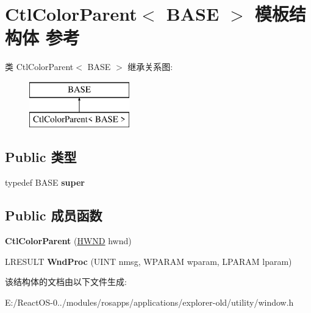 \hypertarget{struct_ctl_color_parent}{}\section{Ctl\+Color\+Parent$<$ B\+A\+SE $>$ 模板结构体 参考}
\label{struct_ctl_color_parent}
类 Ctl\+Color\+Parent$<$ B\+A\+SE $>$ 继承关系图\+:\begin{figure}[H]
\begin{center}
\leavevmode
\includegraphics[height=2.000000cm]{struct_ctl_color_parent}
\end{center}
\end{figure}
\subsection*{Public 类型}
\begin{DoxyCompactItemize}
\item 
\mbox{\label{struct_ctl_color_parent_a9f4a4cc96a7568c4eddf6995f6436ceb}} 
typedef B\+A\+SE {\bfseries super}
\end{DoxyCompactItemize}
\subsection*{Public 成员函数}
\begin{DoxyCompactItemize}
\item 
\mbox{\label{struct_ctl_color_parent_a9aa46d04e4dd06833fea2973e1244ac1}} 
{\bfseries Ctl\+Color\+Parent} (\hyperlink{interfacevoid}{H\+W\+ND} hwnd)
\item 
\mbox{\label{struct_ctl_color_parent_ac0792890eed5bc580118ea206e60477c}} 
L\+R\+E\+S\+U\+LT {\bfseries Wnd\+Proc} (U\+I\+NT nmsg, W\+P\+A\+R\+AM wparam, L\+P\+A\+R\+AM lparam)
\end{DoxyCompactItemize}


该结构体的文档由以下文件生成\+:\begin{DoxyCompactItemize}
\item 
E\+:/\+React\+O\+S-\/0../modules/rosapps/applications/explorer-\/old/utility/window.\+h\end{DoxyCompactItemize}
